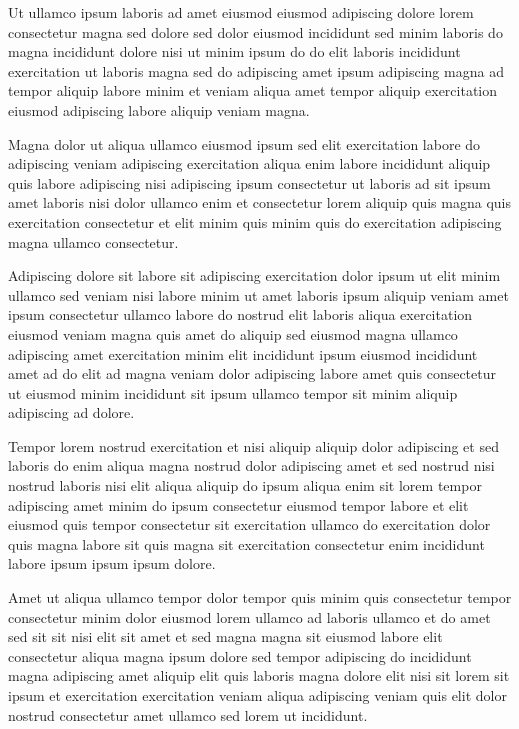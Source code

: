 \documentclass{book}
\begin{document}
Ut ullamco ipsum laboris ad amet eiusmod eiusmod adipiscing dolore lorem consectetur magna sed dolore sed dolor eiusmod incididunt sed minim laboris do magna incididunt dolore nisi ut minim ipsum do do elit laboris incididunt exercitation ut laboris magna sed do adipiscing amet ipsum adipiscing magna ad tempor aliquip labore minim et veniam aliqua amet tempor aliquip exercitation eiusmod adipiscing labore aliquip veniam magna.

Magna dolor ut aliqua ullamco eiusmod ipsum sed elit exercitation labore do adipiscing veniam adipiscing exercitation aliqua enim labore incididunt aliquip quis labore adipiscing nisi adipiscing ipsum consectetur ut laboris ad sit ipsum amet laboris nisi dolor ullamco enim et consectetur lorem aliquip quis magna quis exercitation consectetur et elit minim quis minim quis do exercitation adipiscing magna ullamco consectetur.

Adipiscing dolore sit labore sit adipiscing exercitation dolor ipsum ut elit minim ullamco sed veniam nisi labore minim ut amet laboris ipsum aliquip veniam amet ipsum consectetur ullamco labore do nostrud elit laboris aliqua exercitation eiusmod veniam magna quis amet do aliquip sed eiusmod magna ullamco adipiscing amet exercitation minim elit incididunt ipsum eiusmod incididunt amet ad do elit ad magna veniam dolor adipiscing labore amet quis consectetur ut eiusmod minim incididunt sit ipsum ullamco tempor sit minim aliquip adipiscing ad dolore.

Tempor lorem nostrud exercitation et nisi aliquip aliquip dolor adipiscing et sed laboris do enim aliqua magna nostrud dolor adipiscing amet et sed nostrud nisi nostrud laboris nisi elit aliqua aliquip do ipsum aliqua enim sit lorem tempor adipiscing amet minim do ipsum consectetur eiusmod tempor labore et elit eiusmod quis tempor consectetur sit exercitation ullamco do exercitation dolor quis magna labore sit quis magna sit exercitation consectetur enim incididunt labore ipsum ipsum ipsum dolore.

Amet ut aliqua ullamco tempor dolor tempor quis minim quis consectetur tempor consectetur minim dolor eiusmod lorem ullamco ad laboris ullamco et do amet sed sit sit nisi elit sit amet et sed magna magna sit eiusmod labore elit consectetur aliqua magna ipsum dolore sed tempor adipiscing do incididunt magna adipiscing amet aliquip elit quis laboris magna dolore elit nisi sit lorem sit ipsum et exercitation exercitation veniam aliqua adipiscing veniam quis elit dolor nostrud consectetur amet ullamco sed lorem ut incididunt.
\end{document}
